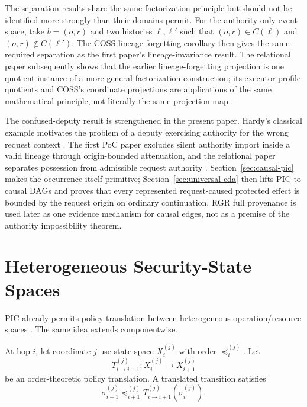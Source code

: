\documentclass[10pt,twocolumn]{article}
\newcommand{\Model}{\textnormal{\textsc{COSS}}\xspace}
\newcommand{\coord}{\sigma}
\begin{document}
The separation results share the same factorization principle but should not be
identified more strongly than their domains permit.  For the authority-only
event space, take $b=(o,r)$ and two histories $\ell,\ell'$ such that
$(o,r)\in C(\ell)$ and $(o,r)\notin C(\ell')$.  The \Model
lineage-forgetting corollary then gives the same required separation as the
first paper's lineage-invariance result.  The relational paper subsequently
shows that the earlier lineage-forgetting projection is one quotient instance
of a more general factorization construction; its executor-profile quotients and
\Model's coordinate projections are applications of the same mathematical
principle, not literally the same projection map \cite{gallo_relational2026}.

The confused-deputy result is strengthened in the present paper. Hardy's
classical example motivates the problem of a deputy exercising authority for
the wrong request context \cite{hardy1988}. The first PoC paper excludes silent
authority import inside a valid lineage through origin-bounded attenuation, and
the relational paper separates possession from admissible request authority
\cite{gallo_relational2026}. Section~\ref{sec:causal-pic} makes the occurrence
itself primitive; Section~\ref{sec:universal-cda} then lifts PIC to causal DAGs
and proves that every represented request-caused protected effect is bounded by
the request origin on ordinary continuation. RGR full provenance is used later
as one evidence mechanism for causal edges, not as a premise of the authority
impossibility theorem.


\section{Heterogeneous Security-State Spaces}

PIC already permits policy translation between heterogeneous operation/resource
spaces \cite{gallo_poc2026}.  The same idea extends componentwise.

At hop $i$, let coordinate $j$ use state space $X_i^{(j)}$ with order
$\preceq_i^{(j)}$.  Let
\begin{equation}
  T_{i\rightarrow i+1}^{(j)}:
  X_i^{(j)}\to X_{i+1}^{(j)}
\end{equation}
be an order-theoretic policy translation.  A translated transition satisfies
\begin{equation}
  \coord_{i+1}^{(j)}
  \preceq_{i+1}^{(j)}
  T_{i\rightarrow i+1}^{(j)}(\coord_i^{(j)}).
  \label{eq:translated-transition}
\end{equation}
\end{document}
